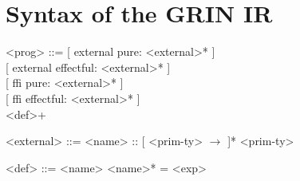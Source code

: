 \documentclass[main.tex]{subfiles}
\begin{document}
	
	\section{Syntax of the GRIN IR}
	
	\setlength{\grammarparsep}{0.1cm} %
	\setlength{\grammarindent}{2.5cm} %
	\begin{grammar}
		<prog> ::= {[} external pure: <external>* {]} \\ 
		{[} external effectful: <external>* {]} \\
		{[} ffi pure: <external>* {]} \\
		{[} ffi effectful: <external>* {]} \\
		<def>+
		
		<external> ::= <name> :: {[} <prim-ty> $\rightarrow$ {]}* <prim-ty>
		
		<def> ::= <name> <name>* = <exp>
	\end{grammar}
\end{document}
